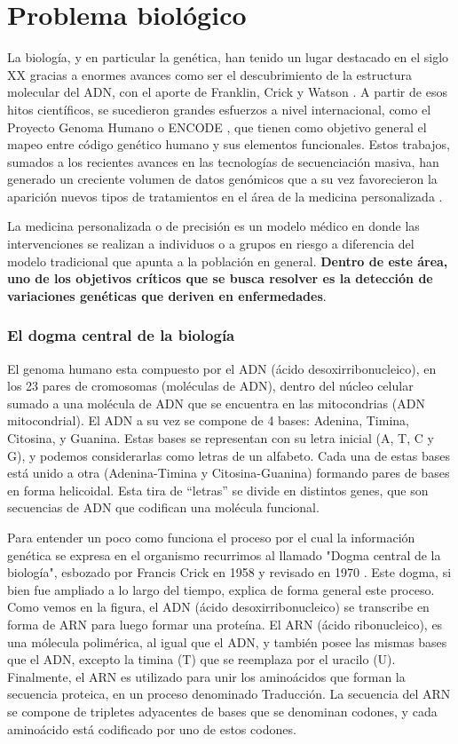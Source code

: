 \section{Problema biológico}

La biología, y en particular la genética, han tenido un lugar destacado en el siglo XX gracias a enormes avances como ser el descubrimiento de la estructura molecular del ADN, con el aporte de Franklin, Crick y Watson \cite{WATSON1953}. A partir de esos hitos científicos, se sucedieron grandes esfuerzos a nivel internacional, como el Proyecto Genoma Humano \cite{Consortium2001} o ENCODE \cite{Consortium2012}, que tienen como objetivo general el mapeo entre código genético humano y sus elementos funcionales. Estos trabajos, sumados a los recientes avances en las tecnologías de secuenciación masiva, han generado un creciente volumen de datos genómicos que a su vez favorecieron la aparición nuevos tipos de tratamientos en el área de la medicina personalizada \cite{doi:10.1056/NEJMp1006304}. 

La medicina personalizada o de precisión es un modelo médico en donde las intervenciones se realizan a individuos o a grupos en riesgo a diferencia del modelo tradicional que apunta a la población en general. \textbf{Dentro de este área, uno de los objetivos críticos que se busca resolver es la detección de variaciones genéticas que deriven en enfermedades}.

\subsubsection{El dogma central de la biología}

El genoma humano esta compuesto por el ADN (ácido desoxirribonucleico), en los 23 pares de cromosomas (moléculas de ADN), dentro del núcleo celular sumado a una molécula de ADN que se encuentra en las mitocondrias (ADN mitocondrial). El ADN a su vez se compone de 4 bases: Adenina, Timina, Citosina, y Guanina. Estas bases se representan con su letra inicial (A, T, C y G), y podemos considerarlas como letras de un alfabeto. Cada una de estas bases está unido a otra (Adenina-Timina y Citosina-Guanina) formando pares de bases en forma helicoidal. Esta tira de ``letras'' se divide en distintos genes, que son secuencias de ADN que codifican una molécula funcional.

Para entender un poco como funciona el proceso por el cual la información genética se expresa en el organismo recurrimos al llamado "Dogma central de la biología", esbozado por Francis Crick en 1958 y revisado en 1970 \cite{CRICK1970}. Este dogma, si bien fue ampliado a lo largo del tiempo, explica de forma general este proceso. Como vemos en la figura, el ADN (ácido desoxirribonucleico) se transcribe en forma de ARN para luego formar una proteína. El ARN (ácido ribonucleico), es una mólecula polimérica, al igual que el ADN, y también posee las mismas bases que el ADN, excepto la timina (T) que se reemplaza por el uracilo (U). Finalmente, el ARN es utilizado para unir los aminoácidos que forman la secuencia proteica, en un proceso denominado Traducción. La secuencia del ARN se compone de tripletes adyacentes de bases que se denominan codones, y cada aminoácido está codificado por uno de estos codones. 

